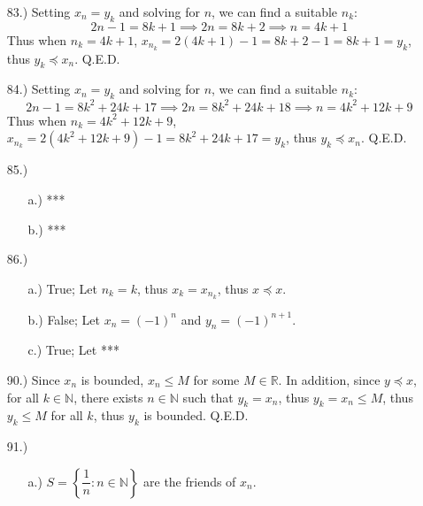 \documentclass[12pt]{article}
\begin{document}
\begin{itemize}
\begin{itemize}
    \end{itemize}

    \item [83.)] Setting $x_n=y_k$ and solving for $n$, we can find a suitable $n_k$:
    \[2n-1=8k+1\implies2n=8k+2\implies n=4k+1\]
    Thus when $n_k=4k+1$, $x_{n_k}=2(4k+1)-1=8k+2-1=8k+1=y_k$, thus $y_k\preceq x_n$. Q.E.D.

    \item [84.)] Setting $x_n=y_k$ and solving for $n$, we can find a suitable $n_k$:
    \[2n-1=8k^2+24k+17\implies2n=8k^2+24k+18\implies n=4k^2+12k+9\]
    Thus when $n_k=4k^2+12k+9$, $x_{n_k}=2(4k^2+12k+9)-1=8k^2+24k+17=y_k$, thus $y_k\preceq x_n$. Q.E.D.

    \item [85.)] \begin{itemize}
        \item [a.)] ***

        \item [b.)] ***
    \end{itemize}

    \item [86.)] \begin{itemize}
        \item [a.)] True; Let $n_k=k$, thus $x_k=x_{n_k}$, thus $x\preceq x$.

        \item [b.)] False; Let $x_n=(-1)^n$ and $y_n=(-1)^{n+1}$. 

        \item [c.)] True; Let ***
    \end{itemize}




    \item [90.)] Since $x_n$ is bounded, $x_n\leq M$ for some $M\in\mathbb{R}$. In addition, since $y\preceq x$, for all $k\in\mathbb{N}$, there exists $n\in\mathbb{N}$ such that $y_k=x_n$, thus $y_k=x_n\leq M$, thus $y_k\leq M$ for all $k$, thus $y_k$ is bounded. Q.E.D.

    \item [91.)] \begin{itemize}
        \item [a.)] $S=\left\{\dfrac{1}{n}:n\in\mathbb{N}\right\}$ are the friends of $x_n$.


\end{itemize}
\end{itemize}
\end{document}
